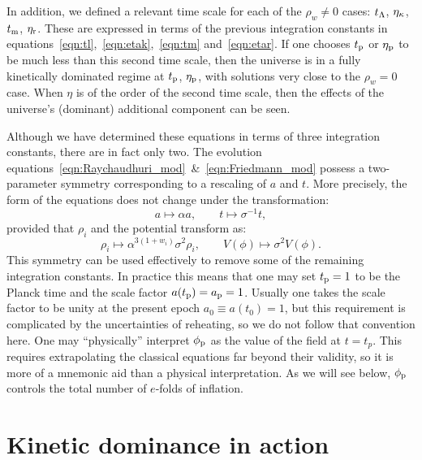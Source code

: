 In addition, we defined a relevant time scale for each of the \(\rho_w \neq 0\) cases: \(t_\mathrm{\Lambda}\), \(\eta_\mathrm{\kappa}\), \(t_{\mathrm{m}}\), \(\eta_{\mathrm{r}}\). These are expressed in terms of the previous integration constants in equations~\eqref{eqn:tl},~\eqref{eqn:etak},~\eqref{eqn:tm} and~\eqref{eqn:etar}. If one chooses \(t_{\mathrm{p}}\) or \(\eta_{\mathrm{p}}\) to be much less than this second time scale, then the universe is in a fully kinetically dominated regime at \(t_{\mathrm{p}}\), \(\eta_{\mathrm{p}}\), with solutions very close to the \(\rho_w=0\) case. When \(\eta\) is of the order of the second time scale, then the effects of the universe's (dominant) additional component can be seen.

Although we have determined these equations in terms of three integration constants, there are in fact only two.  The evolution equations~\eqref{eqn:Raychaudhuri_mod}~\&~\eqref{eqn:Friedmann_mod} possess a two-parameter symmetry corresponding to a rescaling of \(a\) and \(t\). More precisely, the form of the equations does not change under the transformation:
\begin{equation}
  a\mapsto\alpha a, 
  \qquad 
  t \mapsto\sigma^{-1}t,
\end{equation}
provided that \(\rho_i\) and the potential transform as:
\begin{equation}
  \rho_i \mapsto \alpha^{3(1+w_i)}\sigma^2\rho_i, 
  \qquad
  V(\phi) \mapsto \sigma^2 V(\phi).
\end{equation}
This symmetry can be used effectively to remove some of the remaining integration constants. In practice this means that one may set \(t_{\mathrm{p}}=1\) to be the Planck time and the scale factor \(a(t_{\mathrm{p}})=a_{\mathrm{p}}=1\). Usually one takes the scale factor to be unity at the present epoch \(a_0\equiv a(t_0)=1\), but this requirement is complicated by the uncertainties of reheating, so we do not follow that convention here. One may ``physically'' interpret \(\phi_{\mathrm{p}}\) as the value of the field at \(t=t_p\).  This requires extrapolating the classical equations far beyond their validity, so it is more of a mnemonic aid than a physical interpretation.  As we will see below, \(\phi_{\mathrm{p}}\) controls the total number of \(e\)-folds of inflation.













\section{Kinetic dominance in action}
\label{sec:Kinetic_dominance_in_action}

